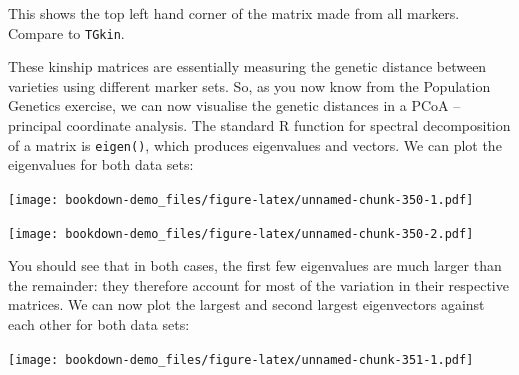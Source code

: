 \documentclass[
]{book}
\newenvironment{Shaded}{\begin{snugshade}}{\end{snugshade}}
\newcommand{\DecValTok}[1]{\textcolor[rgb]{0.00,0.00,0.81}{#1}}
\newcommand{\FunctionTok}[1]{\textcolor[rgb]{0.00,0.00,0.00}{#1}}
\newcommand{\NormalTok}[1]{#1}
\newcommand{\SpecialCharTok}[1]{\textcolor[rgb]{0.00,0.00,0.00}{#1}}
\begin{document}
This shows the top left hand corner of the matrix made from all markers. Compare to \texttt{TGkin}.

These kinship matrices are essentially measuring the genetic distance between varieties using different marker sets. So, as you now know from the Population Genetics exercise, we can now visualise the genetic distances in a PCoA -- principal coordinate analysis. The standard R function for spectral decomposition of a matrix is \texttt{eigen()}, which produces eigenvalues and vectors. We can plot the eigenvalues for both data sets:

\begin{Shaded}
\end{Shaded}

\texttt{[image: bookdown-demo\_files/figure-latex/unnamed-chunk-350-1.pdf]}

\begin{Shaded}
\end{Shaded}

\texttt{[image: bookdown-demo\_files/figure-latex/unnamed-chunk-350-2.pdf]}

You should see that in both cases, the first few eigenvalues are much larger than the remainder: they therefore account for most of the variation in their respective matrices. We can now plot the largest and second largest eigenvectors against each other for both data sets:

\begin{Shaded}
\end{Shaded}

\texttt{[image: bookdown-demo\_files/figure-latex/unnamed-chunk-351-1.pdf]}

\begin{Shaded}
\end{Shaded}
\end{document}

